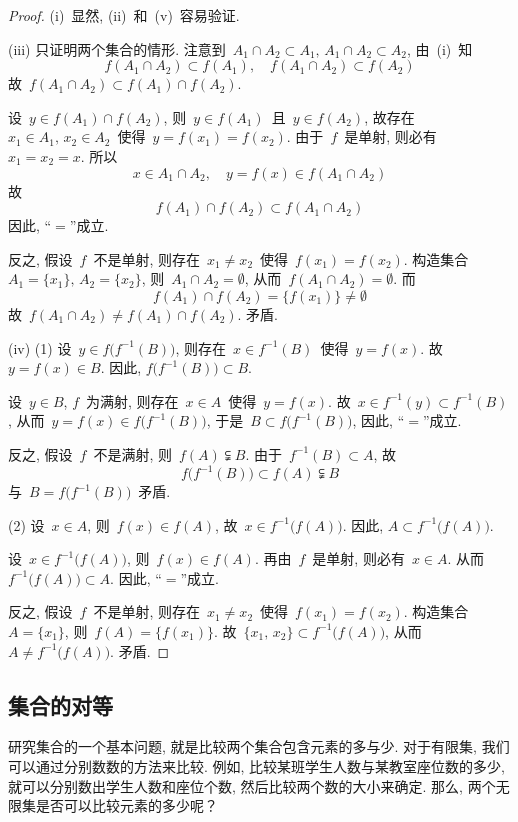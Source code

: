 \begin{proof}
(i)~显然, (ii)~和~(v)~容易验证.

(iii) 只证明两个集合的情形. 注意到~$A_1 \cap A_2 \subset A_1, \, A_1 \cap A_2 \subset A_2$, 由~(i)~知
\[
f(A_1 \cap A_2) \subset f(A_1), \quad f(A_1 \cap A_2) \subset f(A_2)
\]
故~$f(A_1 \cap A_2) \subset f(A_1) \cap f(A_2)$.

设~$y \in f(A_1) \cap f(A_2)$, 则~$y \in f(A_1)$~且~$y \in f(A_2)$, 故存在~$x_1 \in A_1,\, x_2 \in A_2$~使得~$y = f(x_1) = f(x_2)$. 由于~$f$~是单射, 则必有~$x_1 = x_2 = x$. 所以
\[
x \in A_1 \cap A_2, \quad y = f(x) \in f(A_1 \cap A_2)
\]
故
\[
f(A_1) \cap f(A_2) \subset f(A_1 \cap A_2)
\]
因此, ``$=$''成立.

反之, 假设~$f$~不是单射, 则存在~$x_1 \neq x_2$~使得~$f(x_1) = f(x_2)$. 构造集合~$A_1 = \{x_1\}, \, A_2 = \{x_2\}$, 则~$A_1 \cap A_2 = \emptyset$, 从而~$f(A_1 \cap A_2) = \emptyset$. 而
\[
f(A_1) \cap f(A_2) = \{f(x_1)\} \neq \emptyset
\]
故~$f(A_1 \cap A_2) \neq f(A_1) \cap f(A_2)$. 矛盾.

(iv) (1) 设~$y \in f\big(f^{-1}(B)\big)$, 则存在~$x \in f^{-1}(B)$~使得~$y = f(x)$. 故~$y = f(x) \in B$. 因此, $f\big(f^{-1}(B)\big) \subset B$.

设~$y \in B$, $f$~为满射, 则存在~$x \in A$~使得~$y = f(x)$. 故~$x \in f^{-1}(y) \subset f^{-1}(B)$, 从而~$y = f(x) \in f\big(f^{-1}(B)\big)$, 于是~$B \subset f\big(f^{-1}(B)\big)$, 因此, ``$=$''成立.

反之, 假设~$f$~不是满射, 则~$f(A) \subsetneqq B$. 由于~$f^{-1}(B) \subset A$, 故
\[
f\big(f^{-1}(B)\big) \subset f(A) \subsetneqq B
\]
与~$B = f\big(f^{-1}(B)\big)$~矛盾.

(2) 设~$x \in A$, 则~$f(x) \in f(A)$, 故~$x \in f^{-1}\big(f(A)\big)$. 因此, $A \subset f^{-1}\big(f(A)\big)$.

设~$x \in f^{-1}\big(f(A)\big)$, 则~$f(x) \in f(A)$. 再由~$f$~是单射, 则必有~$x \in A$. 从而~$f^{-1}\big(f(A)\big) \subset A$. 因此, ``$=$''成立.

反之, 假设~$f$~不是单射, 则存在~$x_1 \neq x_2$~使得~$f(x_1) = f(x_2)$. 构造集合~$A = \{x_1\}$, 则~$f(A) = \{f(x_1)\}$. 故~$\{x_1, \, x_2\} \subset f^{-1}\big(f(A)\big)$, 从而~$A \neq f^{-1}\big(f(A)\big)$. 矛盾.
\end{proof}

\subsection{集合的对等}

研究集合的一个基本问题, 就是比较两个集合包含元素的多与少. 对于有限集, 我们可以通过分别数数的方法来比较. 例如, 比较某班学生人数与某教室座位数的多少, 就可以分别数出学生人数和座位个数, 然后比较两个数的大小来确定. 那么, 两个无限集是否可以比较元素的多少呢？

